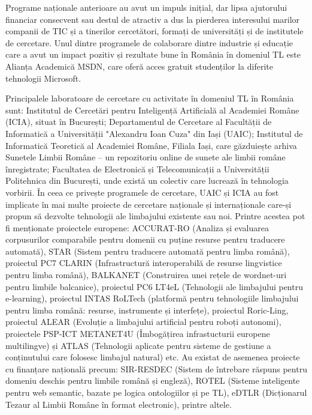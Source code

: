 \documentclass[]{../../metanetpaper}
\begin{document}
\begin{multicols}{2}
Programe naționale anterioare au avut un impuls inițial, dar lipsa ajutorului financiar consecvent sau destul de atractiv a dus la pierderea interesului marilor companii de TIC și a tinerilor cercetători, formați de universități și de institutele de cercetare. Unul dintre programele de colaborare dintre industrie și educație care a avut un impact pozitiv și rezultate bune în România în domeniul TL este Alianța Academică MSDN, care oferă acces gratuit studenților la diferite tehnologii Microsoft. 

Principalele laboratoare de cercetare cu activitate în domeniul TL în România sunt: Institutul de Cercetări pentru Inteligență Artificială al Academiei Române (ICIA), situat în București; Departamentul de Cercetare al Facultății de Informatică a Universității "Alexandru Ioan Cuza" din Iași (UAIC); Institutul de Informatică Teoretică al Academiei Române, Filiala Iași, care găzduiește arhiva Sunetele Limbii Române – un repozitoriu online de sunete ale limbii române înregistrate; Facultatea de Electronică și Telecomunicații a Universității Politehnica din București, unde există un colectiv care lucrează în tehnologia vorbirii. În ceea ce privește programele de cercetare, UAIC și ICIA au fost implicate în mai multe proiecte de cercetare naționale și internaționale care-și propun să dezvolte tehnologii ale limbajului existente sau noi. Printre acestea pot fi menționate proiectele europene: ACCURAT-RO (Analiza și evaluarea corpusurilor comparabile pentru domenii cu puține resurse pentru traducere automată), STAR (Sistem pentru traducere automată pentru limba română), proiectul PC7 CLARIN (Infrastructură interoperabilă de resurse lingvistice pentru limba română), BALKANET (Construirea unei rețele de wordnet-uri pentru limbile balcanice), proiectul PC6 LT4eL (Tehnologii ale limbajului pentru e-learning), proiectul INTAS RoLTech (platformă pentru tehnologiile limbajului pentru limba română: resurse, instrumente și interfețe), proiectul Roric-Ling, proiectul ALEAR (Evoluție a limbajului artificial pentru roboți autonomi), proiectele PSP-ICT METANET4U (Îmbogățirea infrastucturii europene multilingve) și ATLAS (Tehnologii aplicate pentru sisteme de gestiune a conținutului care folosesc limbajul natural) etc. Au existat de asemenea proiecte cu finanțare națională precum: SIR-RESDEC (Sistem de întrebare răspuns pentru domeniu deschis pentru limbile română și engleză), ROTEL (Sisteme inteligente pentru web semantic, bazate pe logica ontologiilor și pe TL), eDTLR (Dicționarul Tezaur al Limbii Române în format electronic), printre altele.


\end{multicols}
\end{document}
